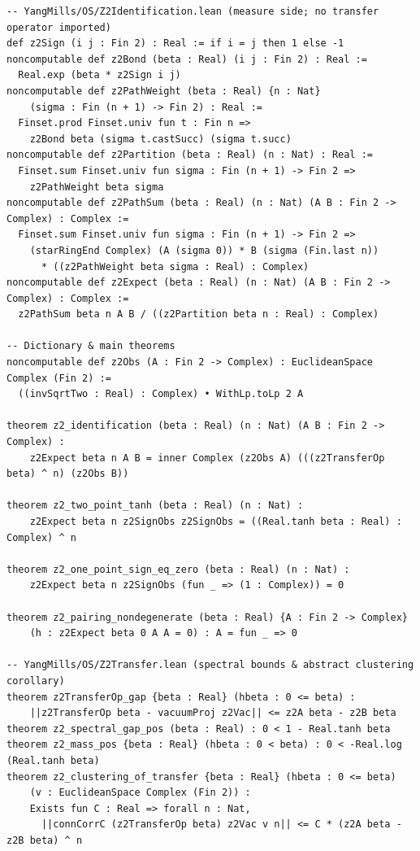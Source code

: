 \documentclass[11pt]{article}
\theoremstyle{remark}
\theoremstyle{definition}
\begin{document}
\begin{small}
\begin{verbatim}
-- YangMills/OS/Z2Identification.lean (measure side; no transfer operator imported)
def z2Sign (i j : Fin 2) : Real := if i = j then 1 else -1
noncomputable def z2Bond (beta : Real) (i j : Fin 2) : Real :=
  Real.exp (beta * z2Sign i j)
noncomputable def z2PathWeight (beta : Real) {n : Nat}
    (sigma : Fin (n + 1) -> Fin 2) : Real :=
  Finset.prod Finset.univ fun t : Fin n =>
    z2Bond beta (sigma t.castSucc) (sigma t.succ)
noncomputable def z2Partition (beta : Real) (n : Nat) : Real :=
  Finset.sum Finset.univ fun sigma : Fin (n + 1) -> Fin 2 =>
    z2PathWeight beta sigma
noncomputable def z2PathSum (beta : Real) (n : Nat) (A B : Fin 2 -> Complex) : Complex :=
  Finset.sum Finset.univ fun sigma : Fin (n + 1) -> Fin 2 =>
    (starRingEnd Complex) (A (sigma 0)) * B (sigma (Fin.last n))
      * ((z2PathWeight beta sigma : Real) : Complex)
noncomputable def z2Expect (beta : Real) (n : Nat) (A B : Fin 2 -> Complex) : Complex :=
  z2PathSum beta n A B / ((z2Partition beta n : Real) : Complex)

-- Dictionary & main theorems
noncomputable def z2Obs (A : Fin 2 -> Complex) : EuclideanSpace Complex (Fin 2) :=
  ((invSqrtTwo : Real) : Complex) • WithLp.toLp 2 A

theorem z2_identification (beta : Real) (n : Nat) (A B : Fin 2 -> Complex) :
    z2Expect beta n A B = inner Complex (z2Obs A) (((z2TransferOp beta) ^ n) (z2Obs B))

theorem z2_two_point_tanh (beta : Real) (n : Nat) :
    z2Expect beta n z2SignObs z2SignObs = ((Real.tanh beta : Real) : Complex) ^ n

theorem z2_one_point_sign_eq_zero (beta : Real) (n : Nat) :
    z2Expect beta n z2SignObs (fun _ => (1 : Complex)) = 0

theorem z2_pairing_nondegenerate (beta : Real) {A : Fin 2 -> Complex}
    (h : z2Expect beta 0 A A = 0) : A = fun _ => 0

-- YangMills/OS/Z2Transfer.lean (spectral bounds & abstract clustering corollary)
theorem z2TransferOp_gap {beta : Real} (hbeta : 0 <= beta) :
    ||z2TransferOp beta - vacuumProj z2Vac|| <= z2A beta - z2B beta
theorem z2_spectral_gap_pos (beta : Real) : 0 < 1 - Real.tanh beta
theorem z2_mass_pos {beta : Real} (hbeta : 0 < beta) : 0 < -Real.log (Real.tanh beta)
theorem z2_clustering_of_transfer {beta : Real} (hbeta : 0 <= beta)
    (v : EuclideanSpace Complex (Fin 2)) :
    Exists fun C : Real => forall n : Nat,
      ||connCorrC (z2TransferOp beta) z2Vac v n|| <= C * (z2A beta - z2B beta) ^ n
\end{verbatim}
\end{small}
\end{document}
